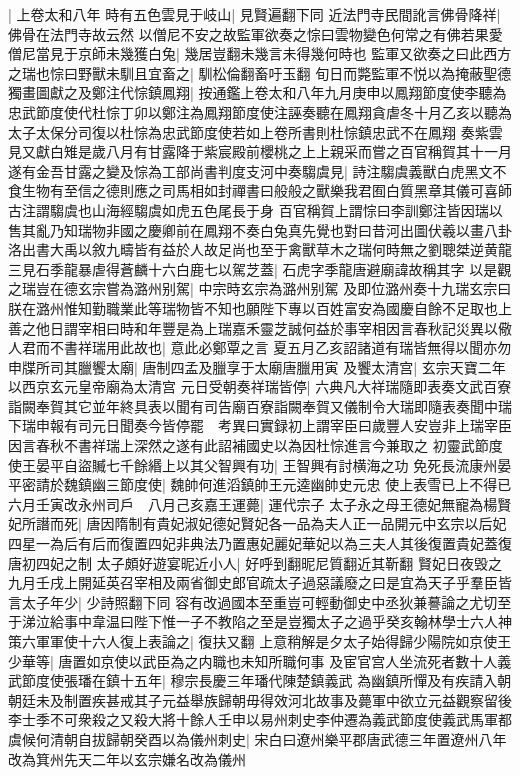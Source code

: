 |{
	上卷太和八年}
時有五色雲見于岐山|{
	見賢遍翻下同}
近法門寺民間訛言佛骨降祥|{
	佛骨在法門寺故云然}
以僧尼不安之故監軍欲奏之悰曰雲物變色何常之有佛若果愛僧尼當見于京師未幾獲白兔|{
	幾居豈翻未幾言未得幾何時也}
監軍又欲奏之曰此西方之瑞也悰曰野獸未馴且宜畜之|{
	馴松倫翻畜吁玉翻}
旬日而斃監軍不悦以為掩蔽聖德獨畫圖獻之及鄭注代悰鎮鳳翔|{
	按通鑑上卷太和八年九月庚申以鳳翔節度使李聽為忠武節度使代杜悰丁卯以鄭注為鳳翔節度使注誣奏聽在鳳翔貪虐冬十月乙亥以聽為太子太保分司復以杜悰為忠武節度使若如上卷所書則杜悰鎮忠武不在鳳翔}
奏紫雲見又獻白雉是歲八月有甘露降于紫宸殿前櫻桃之上上親采而嘗之百官稱賀其十一月遂有金吾甘露之變及悰為工部尚書判度支河中奏騶虞見|{
	詩注騶虞義獸白虎黑文不食生物有至信之德則應之司馬相如封禪書曰般般之獸樂我君囿白質黑章其儀可喜師古注謂騶虞也山海經騶虞如虎五色尾長于身}
百官稱賀上謂悰曰李訓鄭注皆因瑞以售其亂乃知瑞物非國之慶卿前在鳳翔不奏白兔真先覺也對曰昔河出圖伏羲以畫八卦洛出書大禹以敘九疇皆有益於人故足尚也至于禽獸草木之瑞何時無之劉聰桀逆黄龍三見石季龍暴虐得蒼麟十六白鹿七以駕芝蓋|{
	石虎字季龍唐避廟諱故稱其字}
以是觀之瑞豈在德玄宗嘗為潞州别駕|{
	中宗時玄宗為潞州别駕}
及即位潞州奏十九瑞玄宗曰朕在潞州惟知勤職業此等瑞物皆不知也願陛下專以百姓富安為國慶自餘不足取也上善之他日謂宰相曰時和年豐是為上瑞嘉禾靈芝誠何益於事宰相因言春秋記災異以儆人君而不書祥瑞用此故也|{
	意此必鄭覃之言}
夏五月乙亥詔諸道有瑞皆無得以聞亦勿申牒所司其臘饗太廟|{
	唐制四孟及臘享于太廟唐臘用寅}
及饗太清宫|{
	玄宗天寶二年以西京玄元皇帝廟為太清宫}
元日受朝奏祥瑞皆停|{
	六典凡大祥瑞隨即表奏文武百寮詣闕奉賀其它並年終具表以聞有司告廟百寮詣闕奉賀又儀制令大瑞即隨表奏聞中瑞下瑞申報有司元日聞奏今皆停罷　考異曰實録初上謂宰臣曰歲豐人安豈非上瑞宰臣因言春秋不書祥瑞上深然之遂有此詔補國史以為因杜悰進言今兼取之}
初靈武節度使王晏平自盜贓七千餘緡上以其父智興有功|{
	王智興有討横海之功}
免死長流康州晏平密請於魏鎮幽三節度使|{
	魏帥何進滔鎮帥王元逵幽帥史元忠}
使上表雪已上不得已六月壬寅改永州司戶　八月己亥嘉王運薨|{
	運代宗子}
太子永之母王德妃無寵為楊賢妃所譖而死|{
	唐因隋制有貴妃淑妃德妃賢妃各一品為夫人正一品開元中玄宗以后妃四星一為后有后而復置四妃非典法乃置惠妃麗妃華妃以為三夫人其後復置貴妃蓋復唐初四妃之制}
太子頗好遊宴昵近小人|{
	好呼到翻昵尼質翻近其靳翻}
賢妃日夜毁之九月壬戌上開延英召宰相及兩省御史郎官疏太子過惡議廢之曰是宜為天子乎羣臣皆言太子年少|{
	少詩照翻下同}
容有改過國本至重豈可輕動御史中丞狄兼謩論之尤切至于涕泣給事中韋温曰陛下惟一子不教陷之至是豈獨太子之過乎癸亥翰林學士六人神策六軍軍使十六人復上表論之|{
	復扶又翻}
上意稍解是夕太子始得歸少陽院如京使王少華等|{
	唐置如京使以武臣為之内職也未知所職何事}
及宦官宫人坐流死者數十人義武節度使張璠在鎮十五年|{
	穆宗長慶三年璠代陳楚鎮義武}
為幽鎮所憚及有疾請入朝朝廷未及制置疾甚戒其子元益舉族歸朝毋得效河北故事及薨軍中欲立元益觀察留後李士季不可衆殺之又殺大將十餘人壬申以易州刺史李仲遷為義武節度使義武馬軍都虞候何清朝自拔歸朝癸酉以為儀州刺史|{
	宋白曰遼州樂平郡唐武德三年置遼州八年改為箕州先天二年以玄宗嫌名改為儀州}
